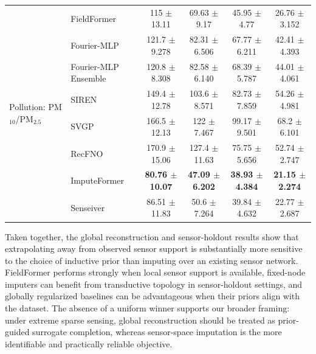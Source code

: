 \begin{table}[htbp]
{\begin{tabular}{llcccc}
\multirow{8}{*}{Pollution: PM$_{10}$/PM$_{2.5}$}
& FieldFormer & 115 $\pm$ 13.11 & 69.63 $\pm$ 9.17 & 45.95 $\pm$ 4.77 & 26.76 $\pm$ 3.152 \\
& Fourier-MLP & 121.7 $\pm$ 9.278 & 82.31 $\pm$ 6.506 & 67.77 $\pm$ 6.211 & 42.41 $\pm$ 4.393 \\
& Fourier-MLP Ensemble & 120.8 $\pm$ 8.308 & 82.58 $\pm$ 6.140 & 68.39 $\pm$ 5.787 & 44.01 $\pm$ 4.061 \\
& SIREN & 149.4 $\pm$ 12.78 & 103.6 $\pm$ 8.571 & 82.73 $\pm$ 7.859 & 54.26 $\pm$ 4.981 \\
& SVGP & 166.5 $\pm$ 12.13 & 122 $\pm$ 7.467 & 99.17 $\pm$ 9.501 & 68.2 $\pm$ 6.101 \\
& RecFNO & 170.9 $\pm$ 15.06 & 127.4 $\pm$ 11.63 & 75.75 $\pm$ 5.656 & 52.74 $\pm$ 2.747 \\
& ImputeFormer & \textbf{80.76 $\pm$ 10.07} & \textbf{47.09 $\pm$ 6.202} & \textbf{38.93 $\pm$ 4.384} & \textbf{21.15 $\pm$ 2.274} \\
& Senseiver & 86.51 $\pm$ 11.83 & 50.6 $\pm$ 7.264 & 39.84 $\pm$ 4.632 & 22.77 $\pm$ 2.687 \\

\hline
\end{tabular}%
}
\end{table}

Taken together, the global reconstruction and sensor-holdout results show that extrapolating away from observed sensor support is substantially more sensitive to the choice of inductive prior than imputing over an existing sensor network. FieldFormer performs strongly when local sensor support is available, fixed-node imputers can benefit from transductive topology in sensor-holdout settings, and globally regularized baselines can be advantageous when their priors align with the dataset. The absence of a uniform winner supports our broader framing: under extreme sparse sensing, global reconstruction should be treated as prior-guided surrogate completion, whereas sensor-space imputation is the more identifiable and practically reliable objective.

